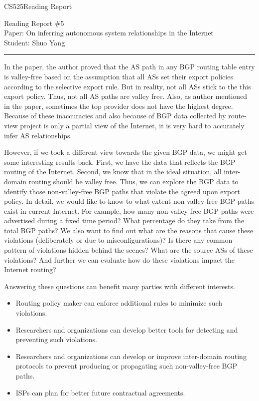\documentclass[11pt]{article}
\def\CourseCode{CS525}
\def\ReportNo{5}
\def\Category{Reading Report}
\def\PaperTitle{On inferring autonomous system relationships in the Internet}
\def\Author{Shuo Yang}
\begin{document}
\noindent

\CourseCode \hfill \Category

\begin{center}
Reading Report \#\ReportNo\\
Paper: \PaperTitle\\
Student: \Author\\
\end{center}

\hrule\smallskip
\vspace{1.5em}

In the paper, the author proved that the AS path in any BGP routing
table entry is valley-free based on the assumption that all ASs set
their export policies according to the selective export rule. But in
reality, not all ASs stick to the this export policy. Thus, not all AS
paths are valley free. Also, as author mentioned in the paper,
sometimes the top provider does not have the highest degree. Because
of these inaccuracies and also because of BGP data collected by
route-view project is only a partial view of the Internet, it is very
hard to accurately infer AS relationships.

\vspace{0.5em}
However, if we took a different view towards the given BGP data, we
might get some interesting results back. First, we have the data that
reflects the BGP routing of the Internet. Second, we know that
in the ideal situation, all inter-domain routing should be valley
free. Thus, we can explore the BGP data to identify those
non-valley-free BGP paths that violate the agreed upon export
policy. In detail, we would like to know to what extent
non-valley-free BGP paths exist in current Internet. For example, how
many non-valley-free BGP paths were advertised during a fixed time
period? What percentage do they take from the total BGP paths? We also
want to find out what
are the reasons that cause these violations (deliberately or due to
misconfigurations)? Is there any common pattern of violations hidden
behind the scenes? What are the source ASs of these violations?
And further we can evaluate how do these violations impact the Internet
routing? 

\vspace{0.5em}
Answering these questions can benefit many parties with different
interests.
\vspace{0.5em}
\begin{itemize}[nolistsep]
\item Routing policy maker can enforce additional rules to minimize
  such violations.
\item Researchers and organizations can develop better tools for
  detecting and preventing such violations.
\item Researchers and organizations can develop or improve
  inter-domain routing protocols to prevent producing or propagating
  such non-valley-free BGP paths.
\item ISPs can plan for better future contractual agreements.
\end{itemize}
\end{document}
